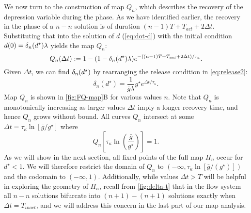 We now turn to the construction of map \(Q_n\), which describes the recovery of the depression variable during the \quiet{} phase.
As we have identified earlier, the recovery in the \quiet{} phase of a \(n-n\) solution is of duration \((n-1)T + T_{act} + 2\Delta t\).
Substituting that into the solution of \(d\) (\cref{eq:dot-d}) with the initial condition \(d(0)=\delta_n(d^\star) \lambda\) yields the map \(Q_{n}\):
\begin{equation}
	\label{eq:Qn-map}
	Q_n(\Delta t) := 1- (1- \delta_n(d^\star) \lambda)e^{-((n-1)T + T_{act} + 2\Delta t)/\tau_a}.
\end{equation}
Given \(\Delta t\), we can find \(\delta_n(d^\star)\) by rearranging the release condition in \cref{eq:release2}:
\begin{equation}
	\label{eq:dn}
	\delta_n(d^\star) = \frac{1}{\bar g \lambda} g^\star e^{\Delta t/\tau_\kappa}.
\end{equation}
Map \(Q_n\) is shown in \cref{fig:FQ-map}B for various values \(n\).
Note that \(Q_n\) is monotonically increasing as larger values \(\Delta t\) imply a longer recovery time, and hence \(Q_{n}\) grows without bound.
All curves \(Q_{n}\) intersect at some \(\Delta t = \tau_\kappa\ln{\left[\bar g/g^\star\right]}\) where
\begin{equation}
	\label{eq:Qn-intersect}
	Q_n\left[\tau_\kappa\ln{\left(\frac{\bar g}{g^\star}\right)}\right]=1.
\end{equation}
As we will show in the next section, all fixed points of the full map \(\Pi_n\) occur for \(d^\star<1\).
We will therefore restrict the domain of \(Q_n\) to \((-\infty, \tau_\kappa\ln{\left[\bar g/(g^\star)\right]})\) and the codomain to \((-\infty, 1)\).
Additionally, while values \(\Delta t>T\) will be helpful in exploring the geometry of \(\Pi_{n}\), recall from \cref{fig:delta-t} that in the flow system all \(n-n\) solutions bifurcate into \((n+1)-(n+1)\) solutions exactly when \(\Delta t = T_{inact}\), and we will address this concern in the last part of our map analysis.

